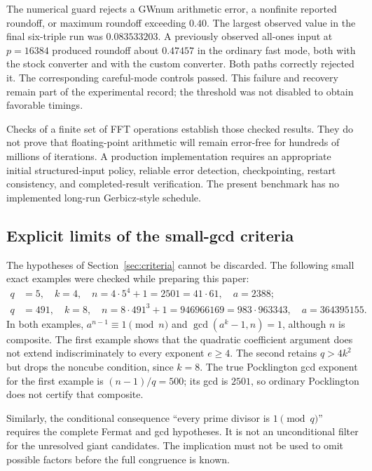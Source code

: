 \documentclass[11pt,a4paper]{article}
\theoremstyle{definition}
\begin{document}
The numerical guard rejects a GWnum arithmetic error, a nonfinite reported
roundoff, or maximum roundoff exceeding $0.40$. The largest observed value
in the final six-triple run was $0.083533203$. A previously observed
all-ones input at $p=16384$ produced roundoff about $0.47457$ in the ordinary
fast mode, both with the stock converter and with the custom converter.
Both paths correctly rejected it. The corresponding careful-mode controls
passed. This failure and recovery remain part of the experimental record;
the threshold was not disabled to obtain favorable timings.

Checks of a finite set of FFT operations establish those checked results.
They do not prove that floating-point arithmetic will remain error-free for
hundreds of millions of iterations. A production implementation requires
an appropriate initial structured-input policy, reliable error detection,
checkpointing, restart consistency, and completed-result verification.
The present benchmark has no implemented long-run Gerbicz-style schedule.

\subsection{Explicit limits of the small-gcd criteria}

The hypotheses of Section~\ref{sec:criteria} cannot be discarded. The following
small exact examples were checked while preparing this paper:
\begin{align*}
 q&=5,\quad k=4,\quad n=4\cdot5^4+1=2501=41\cdot61,\quad a=2388;\\
 q&=491,\quad k=8,\quad n=8\cdot491^3+1=946966169
     =983\cdot963343,\quad a=364395155.
\end{align*}
In both examples, $a^{n-1}\equiv1\pmod n$ and
$\gcd(a^k-1,n)=1$, although $n$ is composite. The first example shows
that the quadratic coefficient argument does not extend indiscriminately
to every exponent $e\ge4$. The second retains $q>4k^2$ but drops the
noncube condition, since $k=8$. The true Pocklington gcd exponent for the
first example is $(n-1)/q=500$; its gcd is $2501$, so ordinary Pocklington
does not certify that composite.

Similarly, the conditional consequence ``every prime divisor is
$1\pmod q$'' requires the complete Fermat and gcd hypotheses. It is not
an unconditional filter for the unresolved giant candidates. The implication
must not be used to omit possible factors before the full congruence is known.
\end{document}

